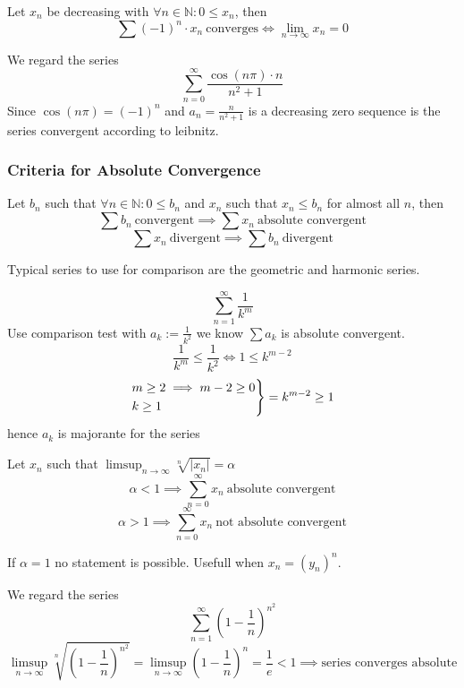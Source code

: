 \begin{proposition}\label{pro:leibnitz}
   Let \(x_n\) be decreasing with \(\forall n \in \mathbb{N}: 0 \leq x_n\), then
   \[\sum (-1)^{n} \cdot x_n~\text{converges} \iff \lim_{n \to \infty} x_n = 0\]
\end{proposition}
\begin{example}
   We regard the series
   \[\sum_{n=0}^\infty \frac{\cos(n \pi) \cdot n}{n^2 + 1}\]
   Since \(\cos(n \pi) = (-1)^n\) and \(a_n = \frac{n}{n^2 + 1}\) is a decreasing zero sequence is the series convergent according to leibnitz.
\end{example}

\subsubsection{Criteria for Absolute Convergence}
\begin{proposition}\label{pro:comparison_test}
   Let \(b_n\) such that \(\forall n \in \mathbb{N}: 0 \leq b_n\) and \(x_n\) such that \(x_n \leq b_n\) for almost all \(n\), then
   \[\sum b_n~\text{convergent} \implies \sum x_n~\text{absolute convergent}\]
   \[\sum x_n~\text{divergent} \implies \sum b_n~\text{divergent}\]
\end{proposition}
\begin{remark}
   Typical series to use for comparison are the geometric and harmonic series.
\end{remark}
\begin{example}
   \[\sum_{n=1}^\infty \frac{1}{k^m}\]
   Use comparison test with \(a_k := \frac{1}{k^2}\) we know \(\sum a_k\) is absolute convergent.
   \[\frac{1}{k^m} \leq \frac{1}{k^2} \iff 1 \leq k^{m-2}\]
   \[\begin{drcases}m \geq 2 \implies m-2 \geq 0\\k \geq 1\end{drcases} = k^{m-2} \geq 1\]
   hence \(a_k\) is majorante for the series 
\end{example}

\begin{proposition}\label{pro:root_test}
   Let \(x_n\) such that \(\limsup_{n \to \infty} \sqrt[n]{|x_n|} = \alpha\)
   \[\alpha < 1 \implies \sum_{n=0}^\infty x_n~\text{absolute convergent}\]
   \[\alpha > 1 \implies \sum_{n=0}^\infty x_n~\text{not absolute convergent}\]
\end{proposition}
\begin{remark}
   If \(\alpha = 1\) no statement is possible.
   Usefull when \(x_n = (y_n)^n\).
\end{remark}
\begin{example}
   We regard the series
   \[\sum_{n=1}^\infty \left(1 - \frac{1}{n}\right)^{n^2}\]
   \[\limsup_{n \to \infty} \sqrt[n]{\left(1 - \frac{1}{n}\right)^{n^2}} = \limsup_{n \to \infty} \left(1 - \frac{1}{n}\right)^n = \frac{1}{e} < 1 \implies \text{series converges absolute}\]
\end{example}


